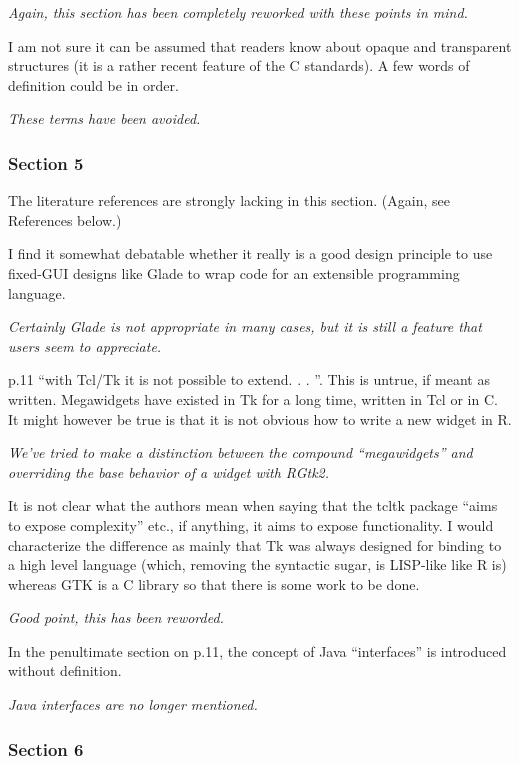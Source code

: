 \documentclass{article}
\begin{document}
\emph{Again, this section has been completely reworked with these points in mind.}

I am not sure it can be assumed that readers know about opaque and transparent
structures (it is a rather recent feature of the C standards). A few words of
definition could be in order.

\emph{These terms have been avoided.}

\subsubsection*{Section 5}

The literature references are strongly lacking in this section. (Again, see References
below.)

I find it somewhat debatable whether it really is a good design principle to
use fixed-GUI designs like Glade to wrap code for an extensible programming
language.

\emph{Certainly Glade is not appropriate in many cases, but it is still
a feature that users seem to appreciate.}

p.11 ``with Tcl/Tk it is not possible to extend. . . ''. This is untrue, if meant as
written. Megawidgets have existed in Tk for a long time, written in Tcl or in
C. It might however be true is that it is not obvious how to write a new widget
in R.

\emph{We've tried to make a distinction between the compound ``megawidgets'' and
overriding the base behavior of a widget with RGtk2.}

It is not clear what the authors mean when saying that the tcltk package ``aims
to expose complexity'' etc., if anything, it aims to expose functionality. I would
characterize the difference as mainly that Tk was always designed for binding
to a high level language (which, removing the syntactic sugar, is LISP-like like
R is) whereas GTK is a C library so that there is some work to be done.

\emph{Good point, this has been reworded.}

In the penultimate section on p.11, the concept of Java ``interfaces'' is introduced
without definition.

\emph{Java interfaces are no longer mentioned.}

\subsubsection*{Section 6}
\end{document}
